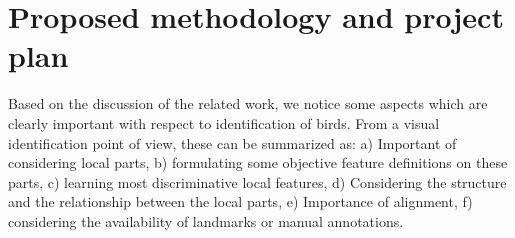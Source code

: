 \documentclass{article}
\begin{document}
\section{Proposed methodology and project plan}


Based on the discussion of the related work, we notice some aspects which are clearly important with respect to identification of birds. From a visual identification point of view, these can be summarized as: a) Important of considering local parts, b) formulating some objective feature definitions on these parts, c) learning most discriminative local features, d) Considering the structure and the relationship between the local parts, e) Importance of alignment, f) considering the availability of landmarks or manual annotations. 
\end{document}
